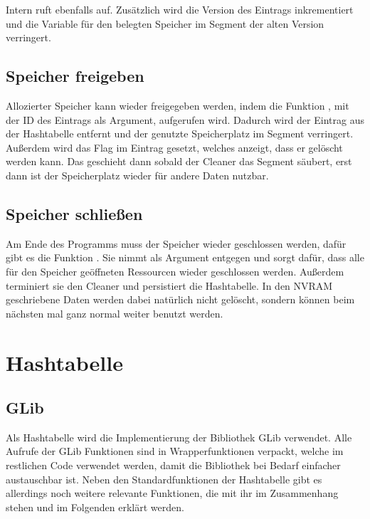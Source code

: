 \documentclass{class/thesis}
\begin{document}
\begin{thesis}
	Intern ruft  ebenfalls  auf. Zusätzlich wird die Version des Eintrags inkrementiert und die Variable für den belegten Speicher im Segment der alten Version verringert.


	\subsection{Speicher freigeben}
	
	Allozierter Speicher kann wieder freigegeben werden, indem die Funktion , mit der ID des Eintrags als Argument, aufgerufen wird. Dadurch wird der Eintrag aus der Hashtabelle entfernt und der genutzte Speicherplatz im Segment verringert. Außerdem wird das Flag im Eintrag gesetzt, welches anzeigt, dass er gelöscht werden kann. Das geschieht dann sobald der Cleaner das Segment säubert, erst dann ist der Speicherplatz wieder für andere Daten nutzbar.
	
	
	\subsection{Speicher schließen}
	
	Am Ende des Programms muss der Speicher wieder geschlossen werden, dafür gibt es die Funktion . Sie nimmt  als Argument entgegen und sorgt dafür, dass alle für den Speicher geöffneten Ressourcen wieder geschlossen werden. Außerdem terminiert sie den Cleaner und persistiert die Hashtabelle.
	In den NVRAM geschriebene Daten werden dabei natürlich nicht gelöscht, sondern können beim nächsten mal ganz normal weiter benutzt werden.
	
	
	
	\section{Hashtabelle} \label{hashtable}
	
	\subsection{GLib}
	
	Als Hashtabelle wird die Implementierung der Bibliothek GLib \cite{GLib} verwendet. Alle Aufrufe der GLib Funktionen sind in Wrapperfunktionen verpackt, welche im restlichen Code verwendet werden, damit die Bibliothek bei Bedarf einfacher austauschbar ist. Neben den Standardfunktionen der Hashtabelle gibt es allerdings noch weitere relevante Funktionen, die mit ihr im Zusammenhang stehen und im Folgenden erklärt werden.
	

\end{thesis}
\end{document}

